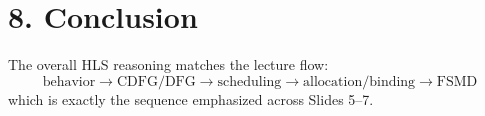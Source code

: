\documentclass[11pt,a4paper]{article}
\begin{document}
\section*{8. Conclusion}
The overall HLS reasoning matches the lecture flow:
\[
\text{behavior} \rightarrow \text{CDFG/DFG} \rightarrow \text{scheduling} \rightarrow \text{allocation/binding} \rightarrow \text{FSMD}
\]
which is exactly the sequence emphasized across Slides 5--7.
\end{document}
